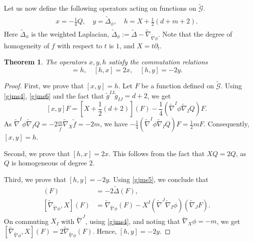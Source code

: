 \documentclass{amsart}
\newtheorem{theorem}{Theorem}[section]
\begin{document}
Let us now define the following operators acting on functions on $\widetilde{\mathcal{G}}$.
\begin{align*}
\begin{split}
x=-\frac{1}{4}Q,\quad  y=\widetilde{\Delta}_\phi,\quad 
h=X+\frac{1}{2}(d+m+2).
\end{split}
\end{align*}
{Here $\widetilde{\Delta}_\phi$ is the weighted Laplacian, $\widetilde{\Delta}_\phi:=\widetilde{\Delta}-\widetilde{\nabla}_{\widetilde{\nabla}\phi}$.} Note that the degree of homogeneity of $f$ with respect to $t$ is $1$, and $X=t\partial_t$. 
\begin{theorem}
The operators $x,y,h$ satisfy the commutation relations
\begin{equation*}
[x,y]=h,\quad 
[h,x]=2x,\quad 
[h,y]=-2y.
\end{equation*}
\end{theorem}
\begin{proof}
First, we prove that $[x,y]=h$. Let $F$ be a function defined on $\widetilde{\mathcal{G}}$. Using \cref{gjms4}, \cref{gjms6} and the fact that $\widetilde{g}^{IJ}\widetilde{g}_{IJ}=d+2$, we get $$[x,y]F=[X+\frac{1}{2}(d+2)](F)-\frac{1}{4}(\widetilde{\nabla}^I\phi\widetilde{\nabla}_IQ)F.$$ As $\widetilde{\nabla}^I\phi\widetilde{\nabla}_I Q=-2\frac{m}{\widetilde{f}}\widetilde{\nabla}_X \widetilde{f}=-2m$, we have $-\frac{1}{4}(\widetilde{\nabla}^I\phi\widetilde{\nabla}_IQ)F=\frac{1}{2}mF$. Consequently, $[x,y]=h$.

Second, we prove that $[h,x]=2x$. This follows from the fact that $XQ=2Q$, as $Q$ is homogeneous of degree $2$.

Third, we prove that $[h,y]=-2y$. Using \cref{gjms5}, we conclude that 
\begin{align*}
[X,\widetilde{\Delta}](F)&=-2\widetilde{\Delta}(F),\\
[\widetilde{\nabla}_{\widetilde{\nabla}\phi},X](F)&=\widetilde{\nabla}_{\widetilde{\nabla}\phi}(F)-X^I(\widetilde{\nabla}^J\widetilde{\nabla}_I\phi)(\widetilde{\nabla}_J F).
\end{align*}On commuting $X_I$ with $\widetilde{\nabla}^J$, using \cref{gjms4}, and noting that $\widetilde{\nabla}_X\phi=-m$, we get {$[\widetilde{\nabla}_{\widetilde{\nabla}\phi},X](F)=2\widetilde{\nabla}_{\widetilde{\nabla}\phi}(F)$.} Hence, $[h,y]=-2y$.\end{proof}
\end{document}
